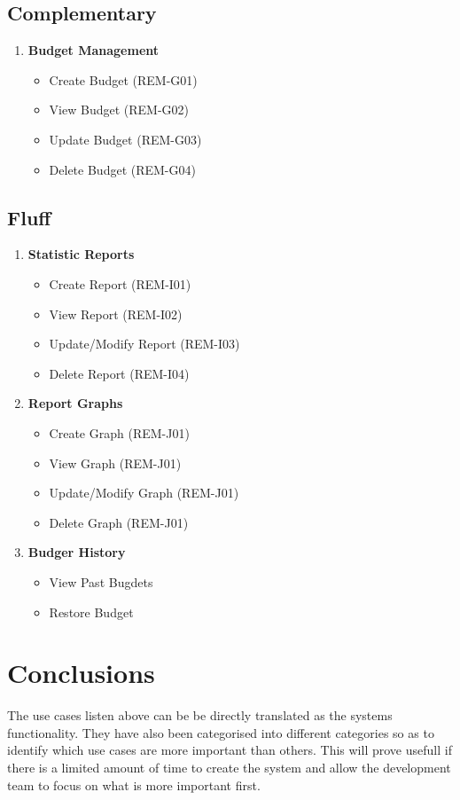\documentclass[11pt]{article}
\begin{document}
		\subsection{Complementary}
		\begin{enumerate}[i]			
			\item \textbf{Budget Management}
			\begin{itemize}
				\item Create Budget (REM-G01)
				\item View Budget (REM-G02)
				\item Update Budget (REM-G03)
				\item Delete Budget (REM-G04)
			\end{itemize}
		\end{enumerate}
		
		\subsection{Fluff}
		\begin{enumerate}[i]
			\item \textbf{Statistic Reports}
			\begin{itemize}
				\item Create Report (REM-I01)
				\item View Report (REM-I02)
				\item Update/Modify Report (REM-I03)
				\item Delete Report (REM-I04)
			\end{itemize}
			
			\item \textbf{Report Graphs}
			\begin{itemize}
				\item Create Graph (REM-J01)
				\item View Graph (REM-J01)
				\item Update/Modify Graph (REM-J01)
				\item Delete Graph (REM-J01)
			\end{itemize}
			
			\item \textbf{Budger History}
			\begin{itemize}
				\item View Past Bugdets
				\item Restore Budget
			\end{itemize}
			
		\end{enumerate}
	
	\section{Conclusions}
	\begin{flushleft}
		The use cases listen above can be be directly translated as the systems functionality. They have also been categorised into different categories so as to identify which use cases are more important than others. This will prove usefull if there is a limited amount of time to create the system and allow the development team to focus on what is more important first.
	\end{flushleft}
	
\end{document}
